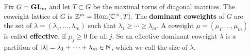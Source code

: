 \documentclass[draft]{article}
\begin{document}
Fix $G = {\mathbf{GL}}_m$ and let $T\subset G$ be the maximal torus of diagonal matrices. 
The coweight lattice of $ G $ is $ \mathbb Z^m = \operatorname{Hom}(\mathbb C^\times,T)$.
% 
The \textbf{dominant coweights} of $ G $ 
are the set of $ \lambda = (\lambda_1, \dots, \lambda_m) $ such that $ \lambda_1 \ge \cdots \ge \lambda_m$. 
% 
A coweight $ \mu = (\mu_1, \dots, \mu_m)$ is called \textbf{effective}, if $ \mu_j \ge 0 $ for all $ j$.
% 
So an effective dominant coweight $ \lambda $ is a partition of $|\lambda| = \lambda_1 + \cdots + \lambda_m\in\mathbb N$, which we call the size of $ \lambda$.
% 
% 
% 
% 
\end{document}
